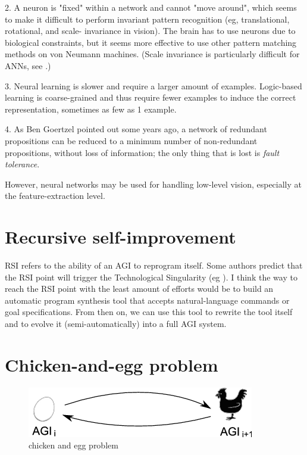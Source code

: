 2.  A neuron is "fixed" within a network and cannot "move around", which seems to make it difficult to perform invariant pattern recognition (eg, translational, rotational, and scale- invariance in vision). The brain has to use neurons due to biological constraints, but it seems more effective to use other pattern matching methods on von Neumann machines. (Scale invariance is particularly difficult for ANNs, see \citep*{Muresan2004}.)

3.  Neural learning is slower and require a larger amount of examples. Logic-based learning is coarse-grained and thus require fewer examples to induce the correct representation, sometimes as few as 1 example.

4.  As Ben Goertzel pointed out some years ago, a network of redundant propositions can be reduced to a minimum number of non-redundant propositions, without loss of information;  the only thing that is lost is \textit{fault tolerance}.

However, neural networks may be used for handling low-level vision, especially at the feature-extraction level.

\section{Recursive self-improvement}
\label{sec:RSI}

RSI refers to the ability of an AGI to reprogram itself.  Some authors predict that the RSI point will trigger the Technological Singularity (eg \citep*{Kurzweil2005}).  I think the way to reach the RSI point with the least amount of efforts would be to build an automatic program synthesis tool that accepts natural-language commands or goal specifications.  From then on, we can use this tool to rewrite the tool itself and to evolve it (semi-automatically) into a full AGI system.

\section{Chicken-and-egg problem}
\label{sec:chicken-and-egg}

\begin{figure}[H]
\centering
\includegraphics{chicken-and-egg1.png}
\caption{chicken and egg problem}
\end{figure}
\vspace{-0.5cm}

